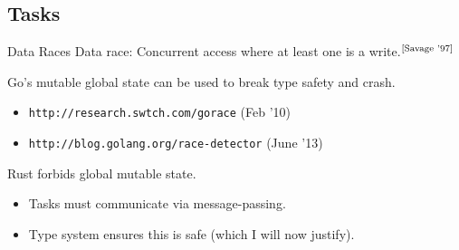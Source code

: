 \documentclass[xcolor=dvipsnames]{beamer}
\begin{document}

\subsection{Tasks}

\begin{frame}{Data Races}
        Data race: Concurrent access where at least one is a write.$^{\small \text{[Savage '97]}}$
        \linegap

        Go's mutable global state can be used to break type safety and crash.
        \begin{itemize}
                \item \texttt{http://research.swtch.com/gorace} (Feb '10)
                \item \texttt{http://blog.golang.org/race-detector} (June '13)
        \end{itemize}
        \pause
        \linegap

        Rust forbids global mutable state.
        \begin{itemize}
                \item Tasks must communicate via message-passing.
		\item Type system ensures this is safe (which I will now justify).
        \end{itemize}
\end{frame}
\end{document}
